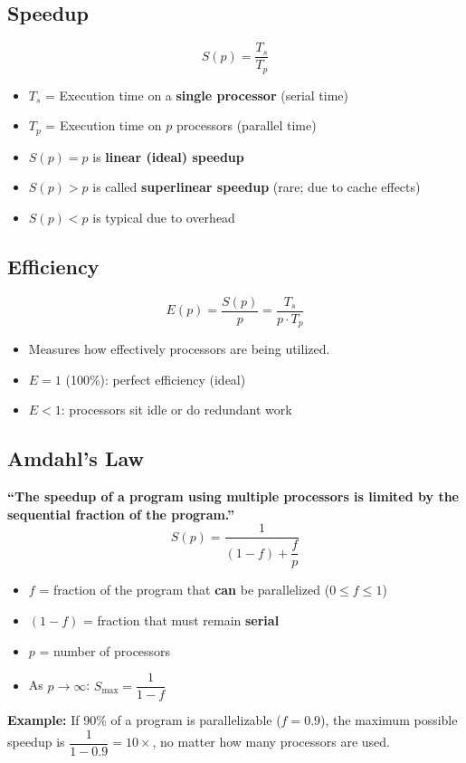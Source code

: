\documentclass[11pt,a4paper]{article}
\begin{document}
\subsection{Speedup}
\begin{formulabox}
\[
S(p) = \frac{T_s}{T_p}
\]
\begin{itemize}[leftmargin=*, itemsep=2pt]
  \item $T_s$ = Execution time on a \textbf{single processor} (serial time)
  \item $T_p$ = Execution time on $p$ processors (parallel time)
  \item $S(p) = p$ is \textbf{linear (ideal) speedup}
  \item $S(p) > p$ is called \textbf{superlinear speedup} (rare; due to cache effects)
  \item $S(p) < p$ is typical due to overhead
\end{itemize}
\end{formulabox}

\subsection{Efficiency}
\begin{formulabox}
\[
E(p) = \frac{S(p)}{p} = \frac{T_s}{p \cdot T_p}
\]
\begin{itemize}[leftmargin=*, itemsep=2pt]
  \item Measures how effectively processors are being utilized.
  \item $E = 1$ (100\%): perfect efficiency (ideal)
  \item $E < 1$: processors sit idle or do redundant work
\end{itemize}
\end{formulabox}

\subsection{Amdahl's Law}
\begin{alertbox}
\textbf{``The speedup of a program using multiple processors is limited by the sequential fraction of the program.''}
\[
S(p) = \frac{1}{(1 - f) + \dfrac{f}{p}}
\]
\begin{itemize}[leftmargin=*, itemsep=2pt]
  \item $f$ = fraction of the program that \textbf{can} be parallelized ($0 \leq f \leq 1$)
  \item $(1-f)$ = fraction that must remain \textbf{serial}
  \item $p$ = number of processors
  \item As $p \to \infty$: $S_{\max} = \dfrac{1}{1-f}$
\end{itemize}
\textbf{Example:} If 90\% of a program is parallelizable ($f=0.9$), the maximum possible speedup is $\dfrac{1}{1-0.9} = 10\times$, no matter how many processors are used.
\end{alertbox}
\end{document}
